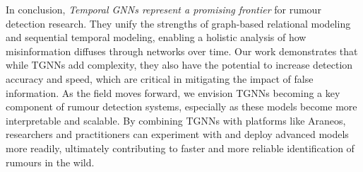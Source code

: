 \documentclass{cshonours}
\begin{document}
In conclusion, \emph{Temporal GNNs represent a promising frontier} for rumour detection research. They unify the strengths of graph-based relational modeling and sequential temporal modeling, enabling a holistic analysis of how misinformation diffuses through networks over time. Our work demonstrates that while TGNNs add complexity, they also have the potential to increase detection accuracy and speed, which are critical in mitigating the impact of false information. As the field moves forward, we envision TGNNs becoming a key component of rumour detection systems, especially as these models become more interpretable and scalable. By combining TGNNs with platforms like Araneos, researchers and practitioners can experiment with and deploy advanced models more readily, ultimately contributing to faster and more reliable identification of rumours in the wild.

\appendix


\end{document}
